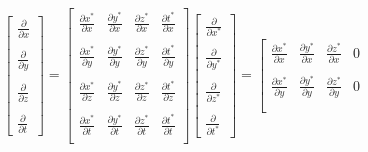 \documentclass[oribibl]{llncs}
\begin{document}
\begin{equation}                       
\left[                 
  \begin{array}{c}  
    \frac{\partial}{\partial x}  \\  \nonumber \\ 
    \frac{\partial}{\partial y}  \\ \nonumber \\ 
    \frac{\partial}{\partial z}  \\ \nonumber \\ 
    \frac{\partial}{\partial t} 
  \end{array}
\right]
 =  
\left[             
  \begin{array}{cccc}  
    \frac{\partial x^*}{\partial x} & \frac{\partial y^*}{\partial x} & \frac{\partial z^*}{\partial x} & \frac{\partial t^*}{\partial x}\\    \\ 
    \frac{\partial x^*}{\partial y} & \frac{\partial y^*}{\partial y} & \frac{\partial z^*}{\partial y} & \frac{\partial t^*}{\partial y}\\    \\ 
    \frac{\partial x^*}{\partial z} & \frac{\partial y^*}{\partial z} & \frac{\partial z^*}{\partial z} & \frac{\partial t^*}{\partial z}\\    \\ 
    \frac{\partial x^*}{\partial t} & \frac{\partial y^*}{\partial t}  & \frac{\partial z^*}{\partial t} & \frac{\partial t^*}{\partial t}\\  
  \end{array}
\right]              
\left[                 
  \begin{array}{c}  
    \frac{\partial}{\partial x^*}  \\   \\ 
    \frac{\partial}{\partial y^*}  \\  \\ 
    \frac{\partial}{\partial z^*}  \\  \\ 
    \frac{\partial}{\partial t^*} 
  \end{array}
\right] 
=
\left[             
  \begin{array}{cccc}  
    \frac{\partial x^*}{\partial x} & \frac{\partial y^*}{\partial x} & \frac{\partial z^*}{\partial x} & 0\\    \\ 
    \frac{\partial x^*}{\partial y} & \frac{\partial y^*}{\partial y} & \frac{\partial z^*}{\partial y} & 0\\    \\ 

\end{array}
\end{equation}
\end{document}
